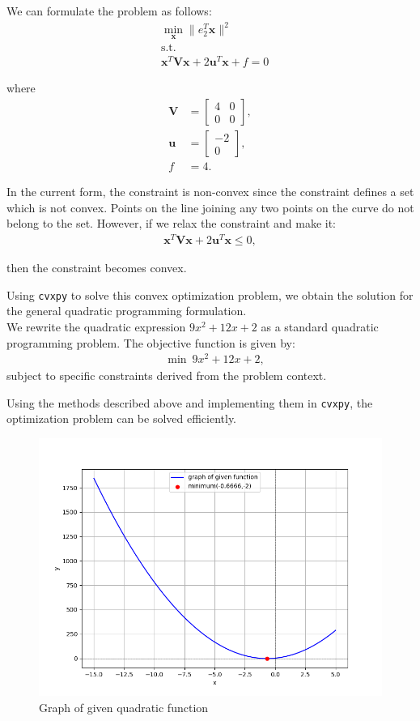 \documentclass[article]{IEEEtran}
\numberwithin{figure}{enumi}
\begin{document}
We can formulate the problem as follows:
\begin{align}
    &\min_{\mathbf{x}} \|e_2^T \mathbf{x}\|^2 \\
    &\text{s.t.} \\
    &\mathbf{x}^T \mathbf{V} \mathbf{x} + 2 \mathbf{u}^T \mathbf{x} + f = 0
\end{align}

where
\begin{align}
    \mathbf{V} &= \begin{bmatrix} 4 & 0 \\
    0 & 0 \end{bmatrix}, \\
    \mathbf{u} &= \begin{bmatrix} -2 \\
    0 \end{bmatrix}, \\
    f &= 4.
\end{align}

In the current form, the constraint is non-convex since the constraint defines a set which is not convex. Points on the line joining any two points on the curve do not belong to the set. However, if we relax the constraint and make it:
\begin{align}
    \mathbf{x}^T \mathbf{V} \mathbf{x} + 2 \mathbf{u}^T \mathbf{x} \leq 0,
\end{align}

then the constraint becomes convex.

Using \texttt{cvxpy} to solve this convex optimization problem, we obtain the solution for the general quadratic programming formulation. \\
We rewrite the quadratic expression $9x^2 + 12x + 2$ as a standard quadratic programming problem. The objective function is given by:
\begin{align}
    &\min \ 9x^2 + 12x + 2,
\end{align}
subject to specific constraints derived from the problem context.

Using the methods described above and implementing them in \texttt{cvxpy}, the optimization problem can be solved efficiently.
\begin{figure}[h!]
	\centering
	\includegraphics[width=\columnwidth]{figures/Figure_1.png}
	\caption{Graph of given quadratic function}
	\label{stemplot}
\end{figure}
\end{document}
